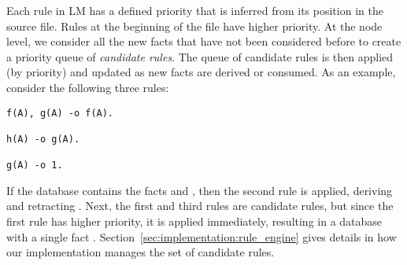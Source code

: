 Each rule in LM has a defined priority that is inferred from its position in the
source file.  Rules at the beginning of the file have higher priority. At the
node level, we consider all the new facts that have not been considered before
to create a priority queue of \emph{candidate rules}. The queue of candidate
rules is then applied (by priority) and updated as new facts are derived or
consumed. As an example, consider the following three rules:

\begin{Verbatim}[fontsize=\codesize]
f(A), g(A) -o f(A).

h(A) -o g(A).

g(A) -o 1.
\end{Verbatim}

If the database contains the facts  and , then the
second rule is applied, deriving  and retracting . Next,
the first and third rules are candidate rules, but since the first rule has
higher priority, it is applied immediately, resulting in a database with a
single fact .  Section~\ref{sec:implementation:rule_engine} gives
details in how our implementation manages the set of candidate rules.

